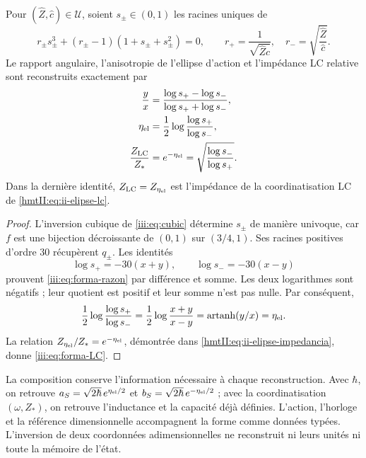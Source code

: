 \begin{proposition}
\label{iii:prop:forma-LC}
Pour $(\widehat Z,\widehat c)\in\mathcal U$, soient $s_\pm\in(0,1)$ les
racines uniques de
\begin{equation}
 r_\pm s_\pm^3+(r_\pm-1)(1+s_\pm+s_\pm^2)=0,
 \qquad
 r_+=\frac1{\sqrt{\widehat Z\widehat c}},\quad
 r_-=\sqrt{\frac{\widehat Z}{\widehat c}}.
 \label{iii:eq:forma-inversion}
\end{equation}
Le rapport angulaire, l’anisotropie de l’ellipse d’action et l’impédance
LC relative sont reconstruits exactement par
\begin{align}
 \frac{y}{x}
 &=\frac{\log s_+-\log s_-}{\log s_++\log s_-},
 \label{iii:eq:forma-razon}\\
 \eta_{\rm el}
 &=\frac12\log\frac{\log s_+}{\log s_-},
 \label{iii:eq:forma-eta}\\
 \frac{Z_{\rm LC}}{Z_*}
 &=e^{-\eta_{\rm el}}
  =\sqrt{\frac{\log s_-}{\log s_+}}.
 \label{iii:eq:forma-LC}
\end{align}
Dans la dernière identité, $Z_{\rm LC}=Z_{\eta_{\rm el}}$ est l’impédance
de la coordinatisation LC de \eqref{hmtII:eq:ii-elipse-lc}.
\end{proposition}
\begin{proof}
L'inversion cubique de \eqref{iii:eq:cubic} détermine $s_\pm$ de manière univoque, car $f$ est une bijection décroissante de $(0,1)$ sur $(3/4,1)$. Ses racines positives d'ordre $30$ récupèrent $q_\pm$. Les identités
\[
 \log s_+=-30(x+y),\qquad \log s_-=-30(x-y)
\]
prouvent \eqref{iii:eq:forma-razon} par différence et somme. Les deux logarithmes
sont négatifs ; leur quotient est positif et leur somme n’est pas nulle. Par conséquent,
\[
 \frac12\log\frac{\log s_+}{\log s_-}
   =\frac12\log\frac{x+y}{x-y}
   =\operatorname{artanh}(y/x)=\eta_{\rm el}.
\]
La relation $Z_{\eta_{\rm el}}/Z_*=e^{-\eta_{\rm el}}$, démontrée dans
\eqref{hmtII:eq:ii-elipse-impedancia}, donne \eqref{iii:eq:forma-LC}.
\end{proof}

La composition conserve l’information nécessaire à chaque reconstruction.
Avec $\hbar$, on retrouve
$a_S=\sqrt{2\hbar}\,e^{\eta_{\rm el}/2}$ et
$b_S=\sqrt{2\hbar}\,e^{-\eta_{\rm el}/2}$ ; avec la coordinatisation
$(\omega,Z_*)$, on retrouve l’inductance et la capacité déjà définies.
L’action, l’horloge et la référence dimensionnelle accompagnent la forme comme
données typées. L’inversion de deux coordonnées adimensionnelles ne
reconstruit ni leurs unités ni toute la mémoire de l’état.

